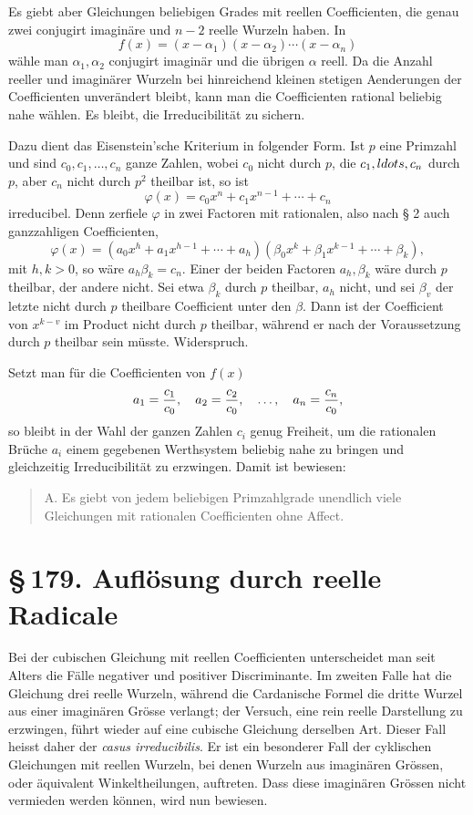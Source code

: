 \documentclass[11pt]{article}
\providecommand{\sect}[2]{\section*{\S\,#1. #2}}
\begin{document}
Es giebt aber Gleichungen beliebigen Grades mit reellen Coefficienten, die genau zwei conjugirt imaginäre und $n-2$ reelle Wurzeln haben. In
\[
  f(x)=(x-\alpha_1)(x-\alpha_2)\cdots(x-\alpha_n)
\]
wähle man $\alpha_1,\alpha_2$ conjugirt imaginär und die übrigen $\alpha$ reell. Da die Anzahl reeller und imaginärer Wurzeln bei hinreichend kleinen stetigen Aenderungen der Coefficienten unverändert bleibt, kann man die Coefficienten rational beliebig nahe wählen. Es bleibt, die Irreducibilität zu sichern.

Dazu dient das Eisenstein'sche Kriterium in folgender Form. Ist $p$ eine Primzahl und sind $c_0,c_1,\ldots,c_n$ ganze Zahlen, wobei $c_0$ nicht durch $p$, die $c_1,\\ldots,c_n$ durch $p$, aber $c_n$ nicht durch $p^2$ theilbar ist, so ist
\[
  \varphi(x)=c_0x^n+c_1x^{n-1}+\cdots+c_n
\]
irreducibel. Denn zerfiele $\varphi$ in zwei Factoren mit rationalen, also nach § 2 auch ganzzahligen Coefficienten,
\[
\varphi(x)=(a_0x^h+a_1x^{h-1}+\cdots+a_h)
          (\beta_0x^k+\beta_1x^{k-1}+\cdots+\beta_k),
\]
mit $h,k>0$, so wäre $a_h\beta_k=c_n$. Einer der beiden Factoren $a_h,\beta_k$ wäre durch $p$ theilbar, der andere nicht. Sei etwa $\beta_k$ durch $p$ theilbar, $a_h$ nicht, und sei $\beta_v$ der letzte nicht durch $p$ theilbare Coefficient unter den $\beta$. Dann ist der Coefficient von $x^{k-v}$ im Product nicht durch $p$ theilbar, während er nach der Voraussetzung durch $p$ theilbar sein müsste. Widerspruch.

Setzt man für die Coefficienten von $f(x)$
\[
  a_1={c_1\over c_0},\quad a_2={c_2\over c_0},\quad \ldots,\quad a_n={c_n\over c_0},
\]
so bleibt in der Wahl der ganzen Zahlen $c_i$ genug Freiheit, um die rationalen Brüche $a_i$ einem gegebenen Werthsystem beliebig nahe zu bringen und gleichzeitig Irreducibilität zu erzwingen. Damit ist bewiesen:
\begin{quote}
A. Es giebt von jedem beliebigen Primzahlgrade unendlich viele Gleichungen mit rationalen Coefficienten ohne Affect.
\end{quote}

\sect{179}{Auflösung durch reelle Radicale}

Bei der cubischen Gleichung mit reellen Coefficienten unterscheidet man seit Alters die Fälle negativer und positiver Discriminante. Im zweiten Falle hat die Gleichung drei reelle Wurzeln, während die Cardanische Formel die dritte Wurzel aus einer imaginären Grösse verlangt; der Versuch, eine rein reelle Darstellung zu erzwingen, führt wieder auf eine cubische Gleichung derselben Art. Dieser Fall heisst daher der \emph{casus irreducibilis}. Er ist ein besonderer Fall der cyklischen Gleichungen mit reellen Wurzeln, bei denen Wurzeln aus imaginären Grössen, oder äquivalent Winkeltheilungen, auftreten. Dass diese imaginären Grössen nicht vermieden werden können, wird nun bewiesen.
\end{document}
